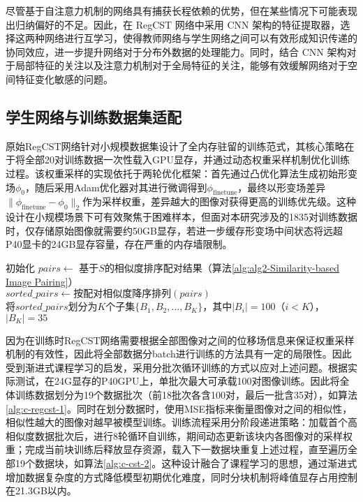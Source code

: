 尽管基于自注意力机制的网络具有捕获长程依赖的优势，但在某些情况下可能表现出归纳偏好的不足。因此，在 RegCST 网络中采用 CNN 架构的特征提取器，选择这两种网络进行互学习，使得教师网络与学生网络之间可以有效形成知识传递的协同效应，进一步提升网络对于分布外数据的处理能力。同时，结合 CNN 架构对于局部特征的关注以及注意力机制对于全局特征的关注，能够有效缓解网络对于空间特征变化敏感的问题。

\subsection{学生网络与训练数据集适配}

原始RegCST网络针对小规模数据集设计了全内存驻留的训练范式，其核心策略在于将全部20对训练数据一次性载入GPU显存，并通过动态权重采样机制优化训练过程。该权重采样的实现依托于两轮优化框架：首先通过凸优化算法生成初始形变场$\phi_0$，随后采用Adam优化器对其进行微调得到$\phi_{\text{finetune}}$，最终以形变场差异$\|\phi_{\text{finetune}} - \phi_0\|_2$作为采样权重，差异越大的图像对获得更高的训练优先级。这种设计在小规模场景下可有效聚焦于困难样本，但面对本研究涉及的1835对训练数据时，仅存储原始图像就需要约50GB显存，若进一步缓存形变场中间状态将远超P40显卡的24GB显存容量，存在严重的内存墙限制。

\begin{algorithm}[h]
    \label{alg:c-regcst-1}
    初始化 $pairs \gets$ 基于$S$的相似度排序配对结果（算法\ref{alg:alg2-Similarity-based Image Pairing}） \\
    $sorted\_pairs \gets \text{按配对相似度降序排列}(pairs)$ \\
    将$sorted\_pairs$划分为$K$个子集$\{B_1,B_2,...,B_K\}$，其中$|B_i|=100$（$i<K$），$|B_K|=35$ \\

\end{algorithm}

因为在训练时RegCST网络需要根据全部图像对之间的位移场信息来保证权重采样机制的有效性，因此将全部数据分batch进行训练的方法具有一定的局限性。因此受到渐进式课程学习的启发，采用分批次循环训练的方式以应对上述问题。根据实际测试，在24G显存的P40GPU上，单批次最大可承载100对图像训练。因此将全体训练数据划分为19个数据批次（前18批次各含100对，最后一批含35对），如算法\ref{alg:c-regcst-1}。同时在划分数据时，使用MSE指标来衡量图像对之间的相似性，相似性越大的图像对越早被模型训练。训练流程采用分阶段递进策略：加载首个高相似度数据批次后，进行8轮循环自训练，期间动态更新该块内各图像对的采样权重；完成当前块训练后释放显存资源，载入下一数据块重复上述过程，直至遍历全部19个数据块，如算法\ref{alg:c-cst-2}。这种设计融合了课程学习的思想，通过渐进式增加数据复杂度的方式降低模型初期优化难度，同时分块机制将峰值显存占用控制在21.3GB以内。

